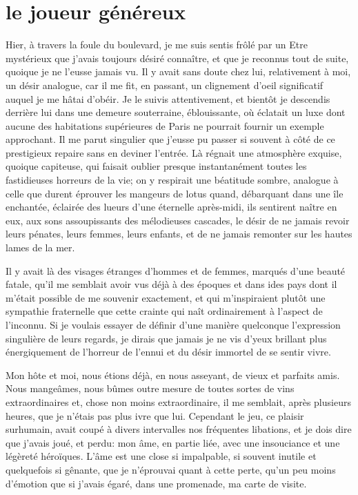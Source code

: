 \quebra\section[Le joueur généreux]{le joueur généreux}

Hier, à travers la foule du boulevard, je me suis sentis frôlé par un
Etre mystérieux que j’avais toujours désiré connaître,
et que je reconnus tout de suite, quoique je ne
l’eusse jamais vu. Il y avait sans doute chez lui,
relativement à moi, un désir analogue, car il me fit, en passant, un
clignement d’oeil significatif auquel je me hâtai
d’obéir. Je le suivis attentivement, et bientôt je
descendis derrière lui dans une demeure souterraine, éblouissante, où
éclatait un luxe dont aucune des habitations supérieures de Paris ne
pourrait fournir un exemple approchant. Il me parut singulier que
j’eusse pu passer si souvent à côté de ce prestigieux
repaire sans en deviner l’entrée. Là régnait une
atmosphère exquise, quoique capiteuse, qui faisait oublier presque
instantanément toutes les fastidieuses horreurs de la vie; on y
respirait une béatitude sombre, analogue à celle que durent éprouver
les mangeurs de lotus quand, débarquant dans une île enchantée,
éclairée des lueurs d’une éternelle après{}-midi, ils
sentirent naître en eux, aux sons assoupissants des mélodieuses
cascades, le désir de ne jamais revoir leurs pénates, leurs femmes,
leurs enfants, et de ne jamais remonter sur les hautes lames de la mer.

Il y avait là des visages étranges d’hommes et de
femmes, marqués d’une beauté fatale,
qu’il me semblait avoir vus déjà à des époques et dans
ides pays dont il m’était possible de me souvenir
exactement, et qui m’inspiraient plutôt une sympathie
fraternelle que cette crainte qui naît ordinairement à
l’aspect de l’inconnu. Si je voulais
essayer de définir d’une manière quelconque
l’expression singulière de leurs regards, je dirais
que jamais je ne vis d’yeux brillant plus
énergiquement de l’horreur de l’ennui
et du désir immortel de se sentir vivre.

Mon hôte et moi, nous étions déjà, en nous asseyant, de vieux et
parfaits amis. Nous mangeâmes, nous bûmes outre mesure de toutes sortes
de vins extraordinaires et, chose non moins extraordinaire, il me
semblait, après plusieurs heures, que je n’étais pas
plus ivre que lui. Cependant le jeu, ce plaisir surhumain, avait coupé
à divers intervalles nos fréquentes libations, et je dois dire que
j’avais joué, et perdu: mon âme, en partie liée, avec
une insouciance et une légèreté héroïques. L’âme est
une close si impalpable, si souvent inutile et quelquefois si gênante,
que je n’éprouvai quant à cette perte,
qu’un peu moins d’émotion que si
j’avais égaré, dans une promenade, ma carte de visite.

